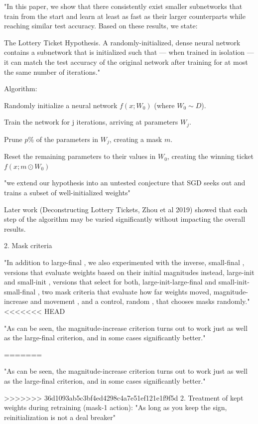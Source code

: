 \documentclass[english]{article}
\begin{document}
"In this paper, we show that there consistently exist smaller subnetworks that train from the start and
learn at least as fast as their larger counterparts while reaching similar test accuracy. Based on these results, we state: 


The Lottery Ticket Hypothesis. A randomly-initialized, dense neural network contains a subnetwork that is initialized such that — when trained in isolation — it can match the test accuracy of the
original network after training for at most the same number of iterations."

Algorithm: 

\benum
\item  Randomly initialize a neural network $f(x;W_0)$ (where $W_0 \sim D$).
\item  Train the network for j iterations, arriving at parameters $W_j$.
\item  Prune $p$\% of the parameters in $W_j$, creating a mask $m$.
\item  Reset the remaining parameters to their values in $W_0$, creating the winning ticket $f(x;m\odot W_0)$
\eenum 

"we extend our hypothesis
into an untested conjecture that SGD seeks out and trains a subset of well-initialized weights"

\item Later work (Deconstructing Lottery Tickets, Zhou et al 2019) showed that each step of the algorithm may be varied significantly without impacting the overall results.

2. Mask criteria

"In addition to large-final , we also experimented with the inverse, small-final , versions that evaluate
weights based on their initial magnitudes instead, large-init and small-init , versions that select
for both, large-init-large-final and small-init-small-final , two mask criteria that evaluate how far
weights moved, magnitude-increase and movement , and a control, random , that chooses masks
randomly."
<<<<<<< HEAD

"As can be seen, the
magnitude-increase criterion turns out to work just as well as the large-final criterion, and in some
cases significantly better."

=======

"As can be seen, the
magnitude-increase criterion turns out to work just as well as the large-final criterion, and in some
cases significantly better."

>>>>>>> 36d1093ab5c3bf4ed4298c4a7e51ef121e1f9f5d
2. Treatment of kept weights during retraining (mask-1 action): "As long as you keep the sign, reinitialization is not a deal breaker"
\end{document}
